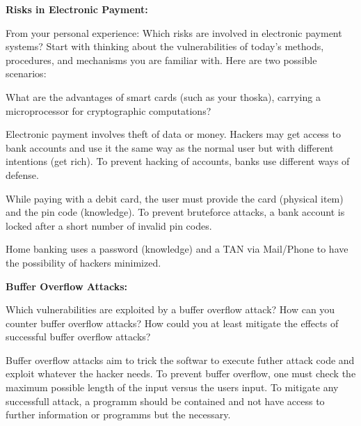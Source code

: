 \documentclass[10pt]{exam}  %
\begin{document}
\begin{questions}
    \question \textbf{Risks in Electronic Payment:}\hfill

    From your personal experience: Which risks are involved in electronic payment systems?
    Start with thinking about the vulnerabilities of today’s methods, procedures, and mechanisms you are familiar with. Here are two possible scenarios:
    What are the advantages of smart cards (such as your thoska), carrying a microprocessor for cryptographic computations?
    \begin{solution}
        Electronic payment involves theft of data or money. Hackers may get access to bank accounts and use it the same way as the normal user but with different intentions (get rich). To prevent hacking of accounts, banks use different ways of defense.

        While paying with a debit card, the user must provide the card (physical item) and the pin code (knowledge). To prevent bruteforce attacks, a bank account is locked after a short number of invalid pin codes.

        Home banking uses a password (knowledge) and a TAN via Mail/Phone to have the possibility of hackers minimized.
    \end{solution}

    \question \textbf{Buffer Overflow Attacks:}\hfill

    Which vulnerabilities are exploited by a buffer overflow attack? How can you counter buffer overflow attacks? How could you at least mitigate the effects of successful buffer overflow attacks?
    \begin{solution}
Buffer overflow attacks aim to trick the softwar to execute futher attack code and exploit whatever the hacker needs. To prevent buffer overflow, one must check the maximum possible length of the input versus the users input. To mitigate any successfull attack, a programm should be contained and not have access to further information or programms but the necessary.


\end{solution}
\end{questions}
\end{document}
